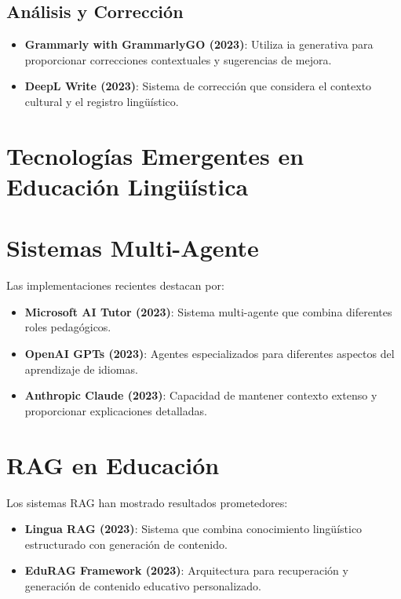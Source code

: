\subsection{Análisis y Corrección}
\begin{itemize}
  \item \textbf{Grammarly with GrammarlyGO (2023)}: Utiliza \gls{ia} generativa para proporcionar correcciones contextuales y sugerencias de mejora.

  \item \textbf{DeepL Write (2023)}: Sistema de corrección que considera el contexto cultural y el registro lingüístico.
\end{itemize}

\section{Tecnologías Emergentes en Educación Lingüística}

\section{Sistemas Multi-Agente}
Las implementaciones recientes destacan por:

\begin{itemize}
  \item \textbf{Microsoft AI Tutor (2023)}: Sistema multi-agente que combina diferentes roles pedagógicos.

  \item \textbf{OpenAI GPTs (2023)}: Agentes especializados para diferentes aspectos del aprendizaje de idiomas.

  \item \textbf{Anthropic Claude (2023)}: Capacidad de mantener contexto extenso y proporcionar explicaciones detalladas.
\end{itemize}

\section{RAG en Educación}
Los sistemas RAG han mostrado resultados prometedores:

\begin{itemize}
  \item \textbf{Lingua RAG (2023)}: Sistema que combina conocimiento lingüístico estructurado con generación de contenido.

  \item \textbf{EduRAG Framework (2023)}: Arquitectura para recuperación y generación de contenido educativo personalizado.
\end{itemize}


